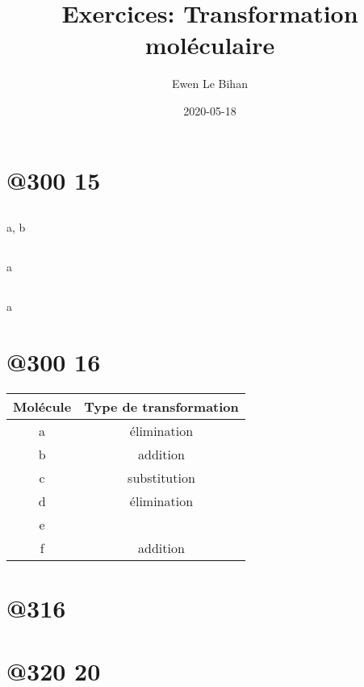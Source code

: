 \documentclass{article}
\title{Exercices: Transformation moléculaire}
\date{2020-05-18}
\author{Ewen Le Bihan}
\begin{document}
\maketitle

\section{@300 15}

\subsection{} a, b
\subsection{} a
\subsection{} a

\section{@300 16}

\begin{table}[h]
	\centering
	\begin{tabular}{c|c}
		Molécule & Type de transformation \\\hline
		a & élimination \\
		b & addition \\
		c & substitution \\
		d & élimination \\
		e & \\
		f & addition \\
	\end{tabular}
\end{table}

\section{@316 }

\newpage
\section{@320 20}
\subsection{}
\end{document}

